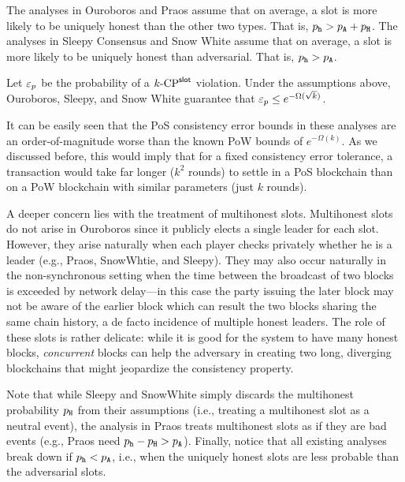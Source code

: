 \begin{description}[font=\normalfont\itshape\space]
  \item[Assumptions on leader election outcomes:] The analyses in Ouroboros and Praos assume that on average, 
  a slot is more likely to be uniquely honest than the other two types. 
  That is, $p_{\mathtt{h}} > p_{\mathtt{A}} + p_{\mathtt{H}}$. The analyses in Sleepy Consensus and Snow White assume that on average, 
  a slot is more likely to be uniquely honest than adversarial. 
  That is, $p_{\mathtt{h}} > p_{\mathtt{A}}$.

  \item[Consistency guarantee:] Let $\mathsf{\varepsilon}_p$ be the probability of a ${k}\text{-}\mathrm{CP}^{\mathsf{slot}}$ violation.
  Under the assumptions above, 
  Ouroboros, Sleepy, and Snow White guarantee that $\mathsf{\varepsilon}_p \leq e^{-\Omega(\sqrt{k})}$.
\end{description}

It can be easily seen that 
the PoS consistency error bounds 
in these analyses 
are an order-of-magnitude worse than the known PoW bounds of $e^{-\Omega(k)}$. 
As we discussed before, 
this would imply that for a fixed consistency error tolerance, 
a transaction would take far longer ($k^2$ rounds) to settle in a PoS blockchain 
than on a PoW blockchain with similar parameters (just $k$ rounds).

A deeper concern lies with the treatment of multihonest slots.
Multihonest slots do not arise in Ouroboros since it publicly elects a single leader for each slot. 
However, they arise naturally when each player
checks privately whether he is a leader (e.g., Praos, SnowWhtie, and Sleepy). 
They may also occur
naturally in the non-synchronous setting when the time between the
broadcast of two blocks is exceeded by network delay---in this case
the party issuing the later block may not be aware of the earlier
block which can result the two blocks sharing the same chain history,
a de facto incidence of multiple honest leaders. The role of these
slots is rather delicate: while it is good for the system to have many
honest blocks, \emph{concurrent} blocks can help the adversary in
creating two long, diverging blockchains that might jeopardize the
consistency property. 

Note that while Sleepy and SnowWhite 
simply discards the multihonest probability $p_{\mathtt{H}}$ from their assumptions
(i.e., treating a multihonest slot as a neutral event), 
the analysis in Praos treats multihonest slots as if they are bad events
(e.g., Praos need $p_{\mathtt{h}} - p_{\mathtt{H}} > p_{\mathtt{A}}$). 
Finally, notice that all existing
analyses break down if $p_{\mathtt{h}} < p_{\mathtt{A}}$, i.e., when the uniquely
honest slots are less probable than the adversarial slots.

